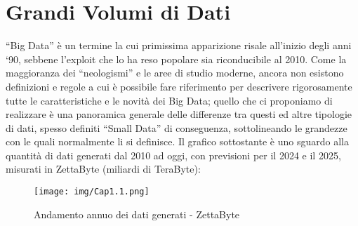 \documentclass[a4paper,12pt]{report}
\begin{document}
\section{Grandi Volumi di Dati}
“Big Data” è un termine la cui primissima apparizione risale all’inizio degli anni ‘90, sebbene l’exploit che lo ha reso popolare sia riconducibile al 2010. Come la maggioranza dei “neologismi” e le aree di studio moderne, ancora non esistono definizioni e regole a cui è possibile fare riferimento per descrivere rigorosamente tutte le caratteristiche e le novità dei Big Data; quello che ci proponiamo di realizzare è una panoramica generale delle differenze tra questi ed altre tipologie di dati, spesso definiti “Small Data” di conseguenza, sottolineando le grandezze con le quali normalmente li si definisce.
Il grafico sottostante è uno sguardo alla quantità di dati generati dal 2010 ad oggi, con previsioni per il 2024 e il 2025, misurati in ZettaByte (miliardi di TeraByte):
\begin{figure}[h]
    \centering
    \texttt{[image: img/Cap1.1.png]}
    \caption{Andamento annuo dei dati generati - ZettaByte}
\end{figure}
\newpage
\noindent
\end{document}
